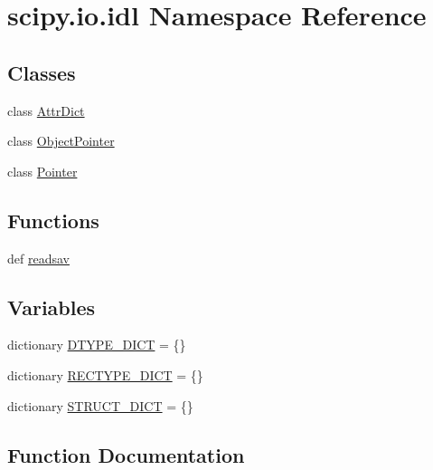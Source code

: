 \hypertarget{namespacescipy_1_1io_1_1idl}{}\section{scipy.\+io.\+idl Namespace Reference}
\label{namespacescipy_1_1io_1_1idl}
\subsection*{Classes}
\begin{DoxyCompactItemize}
\item 
class \hyperlink{classscipy_1_1io_1_1idl_1_1AttrDict}{Attr\+Dict}
\item 
class \hyperlink{classscipy_1_1io_1_1idl_1_1ObjectPointer}{Object\+Pointer}
\item 
class \hyperlink{classscipy_1_1io_1_1idl_1_1Pointer}{Pointer}
\end{DoxyCompactItemize}
\subsection*{Functions}
\begin{DoxyCompactItemize}
\item 
def \hyperlink{namespacescipy_1_1io_1_1idl_a7b9fc9665999f4617c64fb309623c8fe}{readsav}
\end{DoxyCompactItemize}
\subsection*{Variables}
\begin{DoxyCompactItemize}
\item 
dictionary \hyperlink{namespacescipy_1_1io_1_1idl_a4bb0f9aef0ef85b3de31346b63f388b4}{D\+T\+Y\+P\+E\+\_\+\+D\+I\+C\+T} = \{\}
\item 
dictionary \hyperlink{namespacescipy_1_1io_1_1idl_a65b248b8a52afcba6c22176fd186eac4}{R\+E\+C\+T\+Y\+P\+E\+\_\+\+D\+I\+C\+T} = \{\}
\item 
dictionary \hyperlink{namespacescipy_1_1io_1_1idl_ac42fdca15472f9d311fb6d8e9a9e2c0e}{S\+T\+R\+U\+C\+T\+\_\+\+D\+I\+C\+T} = \{\}
\end{DoxyCompactItemize}


\subsection{Function Documentation}
\hypertarget{namespacescipy_1_1io_1_1idl_a7b9fc9665999f4617c64fb309623c8fe}{}
